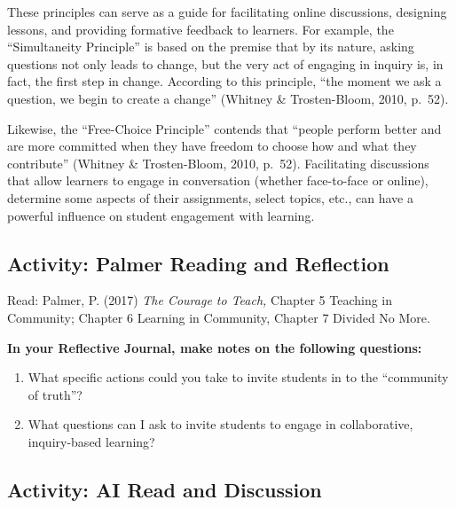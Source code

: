 \documentclass[
]{book}
\providecommand{\tightlist}{%
  \setlength{\itemsep}{0pt}\setlength{\parskip}{0pt}}
\begin{document}
These principles can serve as a guide for facilitating online discussions, designing lessons, and providing formative feedback to learners. For example, the ``Simultaneity Principle'' is based on the premise that by its nature, asking questions not only leads to change, but the very act of engaging in inquiry is, in fact, the first step in change. According to this principle, ``the moment we ask a question, we begin to create a change'' (Whitney \& Trosten-Bloom, 2010, p.~52).

Likewise, the ``Free-Choice Principle'' contends that ``people perform better and are more committed when they have freedom to choose how and what they contribute'' (Whitney \& Trosten-Bloom, 2010, p.~52). Facilitating discussions that allow learners to engage in conversation (whether face-to-face or online), determine some aspects of their assignments, select topics, etc., can have a powerful influence on student engagement with learning.

\hypertarget{activity-palmer-reading-and-reflection-1}{%
\subsection*{Activity: Palmer Reading and Reflection}\label{activity-palmer-reading-and-reflection-1}}

\begin{reflect}
Read: Palmer, P. (2017) \emph{The Courage to Teach,} Chapter 5 Teaching
in Community; Chapter 6 Learning in Community, Chapter 7 Divided No
More.

\textbf{In your Reflective Journal, make notes on the following
questions:}

\begin{enumerate}
\def\labelenumi{\arabic{enumi}.}
\tightlist
\item
  What specific actions could you take to invite students in to the
  ``community of truth''?
\item
  What questions can I ask to invite students to engage in
  collaborative, inquiry-based learning?
\end{enumerate}
\end{reflect}

\hypertarget{activity-ai-read-and-discussion}{%
\subsection*{Activity: AI Read and Discussion}\label{activity-ai-read-and-discussion}}
\end{document}
